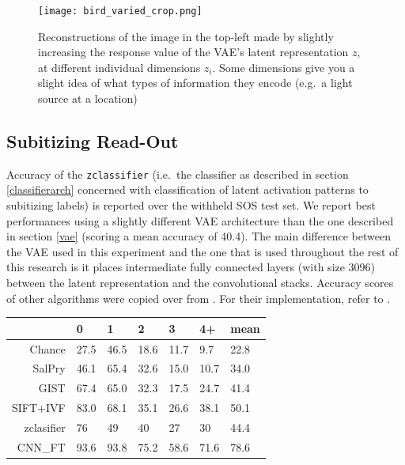 \documentclass[twocolumn]{article}
\begin{document}
{%

\begin{figure}
\centering
\texttt{[image: bird\_varied\_crop.png]}
\caption{Reconstructions of the image in the top-left made by slightly
increasing the response value of the VAE's latent representation \(z\),
at different individual dimensions \(z_i\). Some dimensions give
you a slight idea of what types of information they encode (e.g.~a light source at a
location)}
\label{fig:latent}
\end{figure}

\hypertarget{subitizing-read-out}{%
\subsection{Subitizing Read-Out}\label{subitizing-read-out}}

Accuracy of the \texttt{zclassifier} (i.e.~the classifier as described
in section \ref{classifierarch} concerned
with classification of latent activation patterns to subitizing labels)
is reported over the withheld SOS test set. We report best performances
using a slightly different VAE architecture than the one described in
section \ref{vae} (scoring a mean accuracy of 40.4).
The main difference between the VAE used in this experiment and the one
that is used throughout the rest of this research is it places
intermediate fully connected layers (with size 3096) between the latent
representation and the convolutional stacks. Accuracy scores of other
algorithms were copied over from \citet{zhang2016salient}. For their
implementation, refer to \citet{zhang2016salient}.

\begin{longtable}[]{@{}rllllll@{}}
\toprule
& 0 & 1 & 2 & 3 & 4+ & mean\tabularnewline
\midrule
\endhead
Chance & 27.5 & 46.5 & 18.6 & 11.7 & 9.7 & 22.8\tabularnewline
SalPry & 46.1 & 65.4 & 32.6 & 15.0 & 10.7 & 34.0\tabularnewline
GIST & 67.4 & 65.0 & 32.3 & 17.5 & 24.7 & 41.4\tabularnewline
SIFT+IVF & 83.0 & 68.1 & 35.1 & 26.6 & 38.1 & 50.1\tabularnewline
zclasifier & 76 & 49 & 40 & 27 & 30 & 44.4\tabularnewline
CNN\_FT & 93.6 & 93.8 & 75.2 & 58.6 & 71.6 & 78.6\tabularnewline
\bottomrule
\end{longtable}

}
\end{document}
